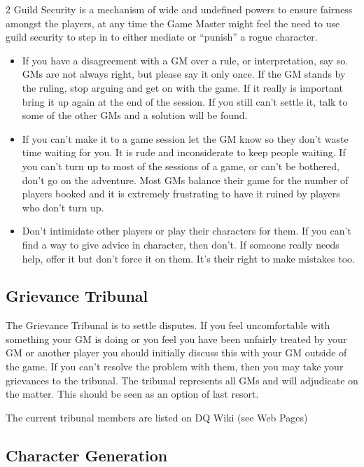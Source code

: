 \begin{multicols}{2}
Guild Security is a mechanism of wide and undefined powers to ensure
fairness amongst the players, at any time the Game Master might feel
the need to use guild security to step in to either mediate or
“punish” a rogue character.

\begin{itemize}
\item If you have a disagreement with a GM over a rule, or
  interpretation, say so.  GMs are not always right, but please say it
  only once. If the GM stands by the ruling, stop arguing and get on
  with the game. If it really is important bring it up again at the
  end of the session. If you still can’t settle it, talk to some of
  the other GMs and a solution will be found.

\item If you can’t make it to a game session let the GM know so they
  don’t waste time waiting for you. It is rude and inconsiderate to
  keep people waiting. If you can’t turn up to most of the sessions of
  a game, or can’t be bothered, don’t go on the adventure.  Most GMs
  balance their game for the number of players booked and it is
  extremely frustrating to have it ruined by players who don’t turn
  up.

\item Don’t intimidate other players or play their characters for
  them.  If you can’t find a way to give advice in character, then
  don’t.  If someone really needs help, offer it but don’t force it on
  them.  It’s their right to make mistakes too.
\end{itemize}

\subsection{Grievance Tribunal}

The Grievance Tribunal is to settle disputes. If you feel
uncomfortable with something your GM is doing or you feel you have
been unfairly treated by your GM or another player you should
initially discuss this with your GM outside of the game. If you can’t
resolve the problem with them, then you may take your grievances to
the tribunal. The tribunal represents all GMs and will adjudicate on
the matter. This should be seen as an option of last resort.

The current tribunal members are listed on DQ Wiki (see Web Pages)

\subsection{Character Generation}


\end{multicols}
